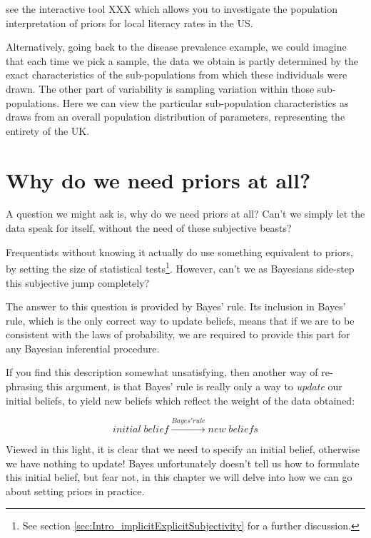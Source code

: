 \documentclass[11pt,fullpage]{book}
\begin{document}
 see the interactive tool XXX which allows you to investigate the population interpretation of priors for local literacy rates in the US. 

Alternatively, going back to the disease prevalence example, we could imagine that each time we pick a sample, the data we obtain is partly determined by the exact characteristics of the sub-populations from which these individuals were drawn. The other part of variability is sampling variation within those sub-populations. Here we can view the particular sub-population characteristics as draws from an overall population distribution of parameters, representing the entirety of the UK. 

\section{Why do we need priors at all?}
A question we might ask is, why do we need priors at all? Can't we simply let the data speak for itself, without the need of these subjective beasts? 

Frequentists without knowing it actually do use something equivalent to priors, by setting the size of statistical tests\footnote{See section \ref{sec:Intro_implicitExplicitSubjectivity} for a further discussion.}. However, can't we as Bayesians side-step this subjective jump completely?

The answer to this question is provided by Bayes' rule. Its inclusion in Bayes' rule, which is the only correct way to update beliefs, means that if we are to be consistent with the laws of probability, we are required to provide this part for any Bayesian inferential procedure. 

If you find this description somewhat unsatisfying, then another way of re-phrasing this argument, is that Bayes' rule is really only a way to \textit{update} our initial beliefs, to yield new beliefs which reflect the weight of the data obtained:

\begin{equation}
initial\; belief \xrightarrow{Bayes' rule} new\;beliefs
\end{equation}

Viewed in this light, it is clear that we need to specify an initial belief, otherwise we have nothing to update! Bayes unfortunately doesn't tell us how to formulate this initial belief, but fear not, in this chapter we will delve into how we can go about setting priors in practice.
\end{document}
